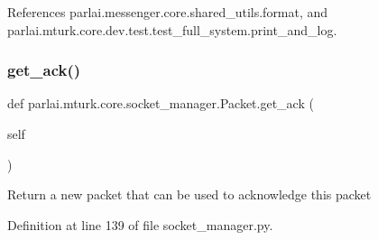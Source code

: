 References parlai.\+messenger.\+core.\+shared\+\_\+utils.\+format, and parlai.\+mturk.\+core.\+dev.\+test.\+test\+\_\+full\+\_\+system.\+print\+\_\+and\+\_\+log.

\mbox{\label{classparlai_1_1mturk_1_1core_1_1socket__manager_1_1Packet_a92f4ae50a21d22ab63b041f23d210928}} 
\subsubsection{\texorpdfstring{get\+\_\+ack()}{get\_ack()}}
{\footnotesize\ttfamily def parlai.\+mturk.\+core.\+socket\+\_\+manager.\+Packet.\+get\+\_\+ack (\begin{DoxyParamCaption}\item[{}]{self }\end{DoxyParamCaption})}

\begin{DoxyVerb}Return a new packet that can be used to acknowledge this packet\end{DoxyVerb}
 

Definition at line 139 of file socket\+\_\+manager.\+py.



